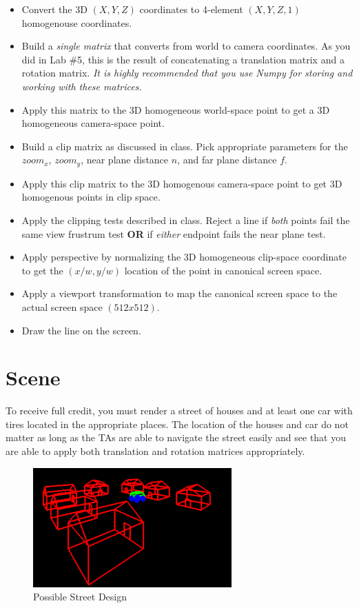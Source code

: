 \documentclass[11pt]{article}
\begin{document}
\begin{itemize}
    \item Convert the 3D $(X,Y,Z)$ coordinates to 4-element $(X,Y,Z,1)$ homogenouse coordinates.
    \item Build a \textit{single matrix} that converts from world to camera coordinates. As you did in Lab \#5, this is the result of concatenating a translation matrix and a rotation matrix. \textit{It is highly recommended that you use Numpy for storing and working with these matrices.}
    \item Apply this matrix to the 3D homogeneous world-space point to get a 3D homogeneous camera-space point.
    \item Build a clip matrix as discussed in class. Pick appropriate parameters for the $zoom_x$, $zoom_y$, near plane distance $n$, and far plane distance $f$.
    \item Apply this clip matrix to the 3D homogenous camera-space point to get 3D homogenous points in clip space.
    \item Apply the clipping tests described in class. Reject a line if \textit{both} points fail the same view frustrum test \textbf{OR} if \textit{either} endpoint fails the near plane test.
    \item Apply perspective by normalizing the 3D homogeneous clip-space coordinate to get the $(x/w, y/w)$ location of the point in canonical screen space.
    \item Apply a viewport transformation to map the canonical screen space to the actual screen space $(512 x 512)$.
    \item Draw the line on the screen.

\end{itemize}

\divider

\section*{Scene}

To receive full credit, you must render a street of houses and at least one car with tires located in the appropriate places. The location of the houses and car do not matter as long as the TAs are able to navigate the street easily and see that you are able to apply both translation and rotation matrices appropriately.

\begin{figure}[hbt!]
	\begin{center}
		\includegraphics[width=3.0in]{street.png}
	\end{center}
	\caption{Possible Street Design}
	\label{fig:street}
\end{figure}
\end{document}
